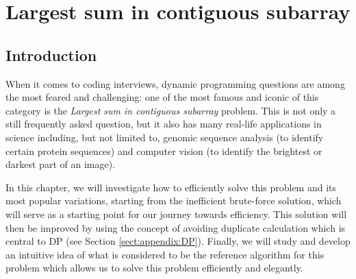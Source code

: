 
\chapter{Largest sum in contiguous subarray}
\label{ch:max_sum_continguous_subarray}
\section*{Introduction}
When it comes to coding interviews, dynamic programming questions are among the most feared and challenging:
one of the most famous and iconic of this category is the  \textit{Largest sum in contiguous subarray} problem. This is not only a still frequently asked question, but it also has many real-life applications in science including, but not limited to, genomic sequence analysis (to identify certain protein sequences) and computer vision (to identify the brightest or darkest part of an
image). 


In this chapter, we will investigate how to efficiently solve this problem and its most popular variations, starting from the inefficient brute-force solution, which will serve as a starting point for our journey towards efficiency. This solution will then be improved by using the concept of avoiding duplicate calculation which is central to DP\cite{bellman1954} (see Section \ref{sect:appendix:DP}). 
Finally, we will study and develop an intuitive idea of what is considered to be the reference algorithm for this problem which allows us to solve this problem efficiently and elegantly.

